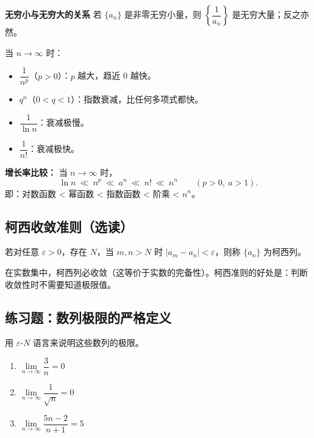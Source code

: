 \documentclass{ctexart}
\newenvironment{extra}{\begin{mdframed}[style=extrastyle, frametitle={* 选读内容（不要求掌握）}]}{\end{mdframed}}
\newenvironment{custom}[1]{\par\noindent \textbf{#1}\quad}{\par\vspace{1em}}
\begin{document}
\begin{custom}{无穷小与无穷大的关系}
若 \(\{a_n\}\) 是非零无穷小量，则 \(\left\{\dfrac{1}{a_n}\right\}\) 是无穷大量；反之亦然。
\end{custom}

\begin{example}[常见无穷小量的比较]
当 \(n \to \infty\) 时：
\begin{itemize}
\item \(\dfrac{1}{n^p}\)（\(p>0\)）：\(p\) 越大，趋近 0 越快。
\item \(q^n\)（\(0 < q < 1\)）：指数衰减，比任何多项式都快。
\item \(\dfrac{1}{\ln n}\)：衰减极慢。
\item \(\dfrac{1}{n!}\)：衰减极快。
\end{itemize}

\textbf{增长率比较：} 当 \(n \to \infty\) 时，
\[
\ln n \ \ll\ n^p \ \ll\ a^n \ \ll\ n! \ \ll\ n^n \qquad (p>0,\ a>1).
\]
即：对数函数 < 幂函数 < 指数函数 < 阶乘 < \(n^n\)。
\end{example}

\begin{extra}
\subsection*{柯西收敛准则（选读）}
\begin{definition}[柯西列]
若对任意 \(\varepsilon > 0\)，存在 \(N\)，当 \(m,n > N\) 时 \(|a_m - a_n| < \varepsilon\)，则称 \(\{a_n\}\) 为柯西列。
\end{definition}
在实数集中，柯西列必收敛（这等价于实数的完备性）。柯西准则的好处是：判断收敛性时不需要知道极限值。
\end{extra}

\subsection*{练习题：数列极限的严格定义}

\begin{exercise}
用 \(\varepsilon\)-\(N\) 语言来说明这些数列的极限。
\begin{enumerate}
\item \(\lim\limits_{n\to\infty} \dfrac{3}{n} = 0\)
\item \(\lim\limits_{n\to\infty} \dfrac{1}{\sqrt{n}} = 0\)
\item \(\lim\limits_{n\to\infty} \dfrac{5n-2}{n+1} = 5\)
\end{enumerate}
\end{exercise}
\end{document}
